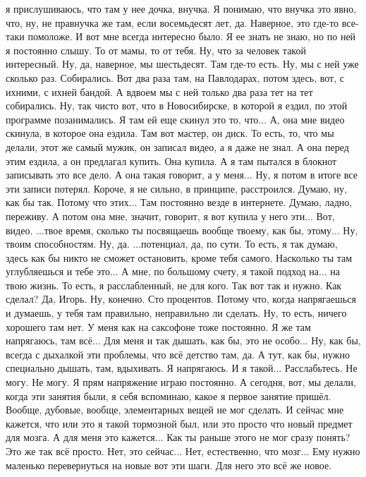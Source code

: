 я прислушиваюсь, что там у нее
дочка, внучка. Я понимаю,
что внучка это явно, что, ну, не правнучка
же там, если восемьдесят лет, да.
Наверное, это где-то все-таки помоложе.
И вот мне всегда интересно было.
Я ее знать не знаю,
но по ней я постоянно слышу. То от мамы,
то от тебя.
Ну, что за человек такой интересный. Ну, да, наверное, мы шестьдесят.
Там где-то есть.
Ну, мы с ней уже сколько раз.
Собирались.
Вот два раза там,
на Павлодарах, потом
здесь, вот,
с ихними, с ихней бандой.
А вдвоем мы с ней только два раза
тет на тет собирались.
Ну, так чисто вот, что в Новосибирске,
в которой я ездил, по этой программе
позанимались. Я там ей
еще скинул
это то, что... А, она мне
видео скинула, в которое она ездила.
Там вот мастер, он
диск. То есть, то, что мы делали,
этот же самый мужик,
он записал видео, а я даже не знал.
А она перед этим ездила, а он
предлагал купить. Она купила.
А я там пытался в блокнот
записывать это все дело.
А она такая говорит, а у меня...
Ну, я потом в итоге все эти записи
потерял. Короче, я
не сильно, в принципе, расстроился.
Думаю, ну, как бы так.
Потому что этих...
Там постоянно везде в интернете.
Думаю, ладно, переживу.
А потом она
мне, значит,
говорит, я вот купила
у него эти... Вот, видео.
...твое время, сколько ты посвящаешь
вообще твоему, как бы, этому...
Ну, твоим способностям.
Ну, да.
...потенциал, да, по сути.
То есть, я так думаю, здесь как бы
никто не сможет остановить, кроме тебя самого.
Насколько ты там углубляешься и тебе это...
А мне, по большому счету,
я такой подход
на...
на твою жизнь.
То есть, я расслабленный, не для кого.
Так вот так и нужно. Как сделал?
Да, Игорь. Ну, конечно.
Сто процентов. Потому что, когда напрягаешься и думаешь,
у тебя там правильно, неправильно ли сделать.
Ну, то есть, ничего хорошего там нет.
У меня как на саксофоне тоже постоянно.
Я же там напрягаюсь, там всё...
Для меня и так
дышать, как бы, это не особо...
Ну, как бы, всегда с дыхалкой
эти проблемы, что всё детство там, да.
А тут, как бы, нужно специально дышать,
там, вдыхивать. Я напрягаюсь.
И я такой...
Расслабьтесь.
Не могу.
Не могу.
Я прям напряжение играю постоянно.
А сегодня, вот, мы делали,
когда эти занятия были,
я себя вспоминаю,
какое я первое занятие пришёл.
Вообще, дубовые, вообще,
элементарных вещей не мог сделать.
И сейчас мне кажется, что
или это я такой тормозной был,
или это просто что новый
предмет для мозга. А для меня это кажется...
Как ты раньше этого не мог сразу понять?
Это же так всё просто.
Нет, это сейчас... Нет, естественно, что мозг...
Ему нужно маленько перевернуться
на новые вот эти шаги.
Для него это всё же новое.
